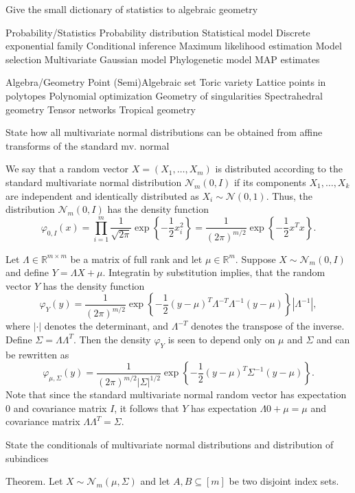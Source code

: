 Give the small dictionary of statistics to algebraic geometry

Probability/Statistics
Probability distribution
Statistical model
Discrete exponential family
Conditional inference
Maximum likelihood estimation
Model selection
Multivariate Gaussian model
Phylogenetic model
MAP estimates

Algebra/Geometry
Point
(Semi)Algebraic set
Toric variety
Lattice points in polytopes
Polynomial optimization
Geometry of singularities
Spectrahedral geometry
Tensor networks
Tropical geometry



State how all multivariate normal distributions can be obtained from affine transforms of the standard mv. normal


We say that a random vector \( X = (X_1, \ldots, X_m) \) is distributed according to the standard multivariate normal distribution 
\( \mathcal{N}_m(0, I) \) if its components \( X_1, \ldots, X_k \) are independent and identically distributed as \( X_i \sim \mathcal{N}(0,1) \). 
Thus, the distribution \( \mathcal{N}_m(0, I) \) has the density function
\[
\varphi_{0,I}(x) = \prod_{i=1}^m \frac{1}{\sqrt{2\pi}} \exp\left\{ -\frac{1}{2} x_i^2 \right\}
= \frac{1}{(2\pi)^{m/2}} \exp\left\{ -\frac{1}{2} x^T x \right\}.
\]

Let \( \Lambda \in \mathbb{R}^{m \times m} \) be a matrix of full rank and let \( \mu \in \mathbb{R}^m \). Suppose \( X \sim \mathcal{N}_m(0,I) \) 
and define \( Y = \Lambda X + \mu \). Integratin by substitution implies, that the random vector \( Y \) has the density function
\[
\varphi_Y(y) = \frac{1}{(2\pi)^{m/2}} \exp\left\{ -\frac{1}{2} (y-\mu)^T \Lambda^{-T} \Lambda^{-1} (y-\mu) \right\} |\Lambda^{-1}|,
\]
where \(|\cdot|\) denotes the determinant, and \(\Lambda^{-T}\) denotes the transpose of the inverse. 
Define \(\Sigma = \Lambda \Lambda^T\). Then the density \(\varphi_Y\) is seen to depend only on \(\mu\) and \(\Sigma\) and can be rewritten as
\[
\varphi_{\mu,\Sigma}(y) = \frac{1}{(2\pi)^{m/2} |\Sigma|^{1/2}} \exp\left\{ -\frac{1}{2} (y-\mu)^T \Sigma^{-1} (y-\mu) \right\}.
\]
Note that since the standard multivariate normal random vector has expectation \( 0 \) and covariance matrix \( I \), it follows 
that \( Y \) has expectation \( \Lambda 0 + \mu = \mu \) and covariance matrix \( \Lambda \Lambda^T = \Sigma \).


State the conditionals of multivariate normal distributions and distribution of subindices

Theorem. Let \( X \sim \mathcal{N}_m(\mu, \Sigma) \) and let \( A, B \subseteq [m] \) be two disjoint index sets.

